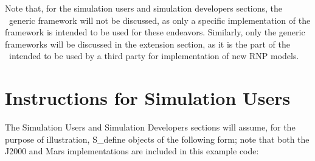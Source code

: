 Note that, for the simulation users and simulation developers sections, the
\ModelDesc\ generic framework will not be discussed, as only a specific
implementation of the framework is intended to be used for these endeavors.
Similarly, only the generic frameworks will be discussed in the extension
section, as it is the part of the \ModelDesc\ intended to be used by a third
party for implementation of new RNP models.

\section{Instructions for Simulation Users}

The Simulation Users and Simulation Developers sections will assume, 
for the purpose of illustration, S\_define
objects of the following form; note that both the J2000 and Mars
implementations are included in this example code:

